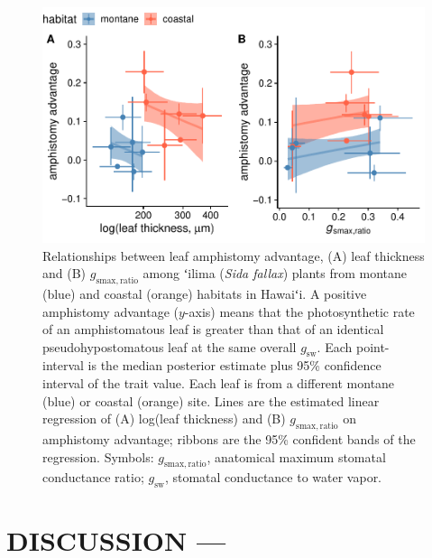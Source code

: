 \documentclass[
  letterpaper,
  DIV=11,
  numbers=noendperiod]{scrartcl}
\begin{document}
\begin{figure}[H]
  \includegraphics{../figures/traits-aa.pdf}
  \caption{Relationships between leaf amphistomy advantage, (A) leaf thickness and (B) $g_\mathrm{smax,ratio}$ among ʻilima (\textit{Sida fallax}) plants from montane (blue) and coastal (orange) habitats in Hawaiʻi. A positive amphistomy advantage ($y$-axis) means that the photosynthetic rate of an amphistomatous leaf is greater than that of an identical pseudohypostomatous leaf at the same overall $g_\mathrm{sw}$. Each point-interval is the median posterior estimate plus 95\% confidence interval of the trait value. Each leaf is from a different montane (blue) or coastal (orange) site. Lines are the estimated linear regression of (A) log(leaf thickness) and (B) $g_\mathrm{smax,ratio}$ on amphistomy advantage; ribbons are the 95\% confident bands of the regression. Symbols: $g_\mathrm{smax,ratio}$, anatomical maximum stomatal conductance ratio; $g_\mathrm{sw}$, stomatal conductance to water vapor.}
  \label{fig:traits-aa}
\end{figure}

\hypertarget{discussion}{%
\section{DISCUSSION ---}\label{discussion}}
\end{document}

